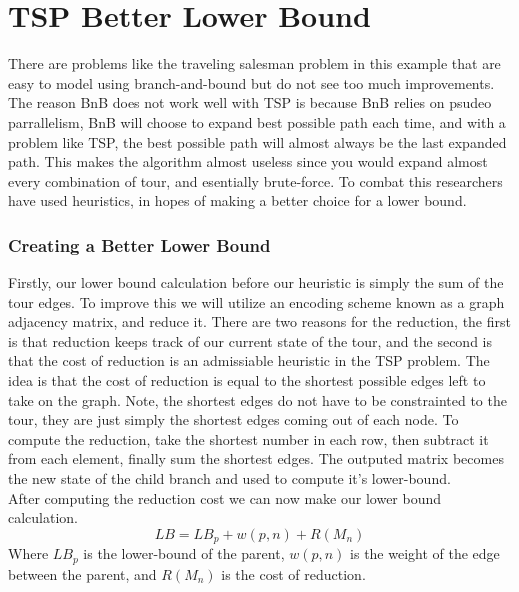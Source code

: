 
\section{TSP Better Lower Bound}
    There are problems like the traveling salesman problem in this example
    that are easy to model using branch-and-bound but do not see too much improvements.
    The reason BnB does not work well with TSP is because BnB relies on psudeo
    parrallelism, BnB will choose to expand best possible path each time, and 
    with a problem like TSP, the best possible path will almost always be the 
    last expanded path. This makes the algorithm almost useless since you 
    would expand almost every combination of tour, and esentially brute-force.
    To combat this researchers have used heuristics, in hopes of making a better
    choice for a lower bound.

    \subsubsection{Creating a Better Lower Bound}
    Firstly, our lower bound calculation before our heuristic is simply the sum 
    of the tour edges. To improve this we will utilize an encoding scheme known as 
    a graph adjacency matrix, and reduce it. There are two reasons for the reduction, 
    the first is that reduction keeps track of our current state of the tour, and the second
    is that the cost of reduction is an admissiable heuristic in the TSP problem.
    The idea is that the cost of reduction is equal to the shortest possible edges left to
    take on the graph. Note, the shortest edges do not have to be constrainted to the tour, they
    are just simply the shortest edges coming out of each node. To compute the reduction, take the
    shortest number in each row, then subtract it from each element, finally sum the shortest edges.
    The outputed matrix becomes the new state of the child branch and used to compute it's lower-bound.\\

    After computing the reduction cost we can now make our lower bound calculation.
    \begin{equation}
        LB = LB_p + w(p, n) + R(M_n)
    \end{equation}
    Where $LB_p$ is the lower-bound of the parent, $w(p, n)$ is the weight of the edge
    between the parent, and $R(M_n)$ is the cost of reduction. 
    
